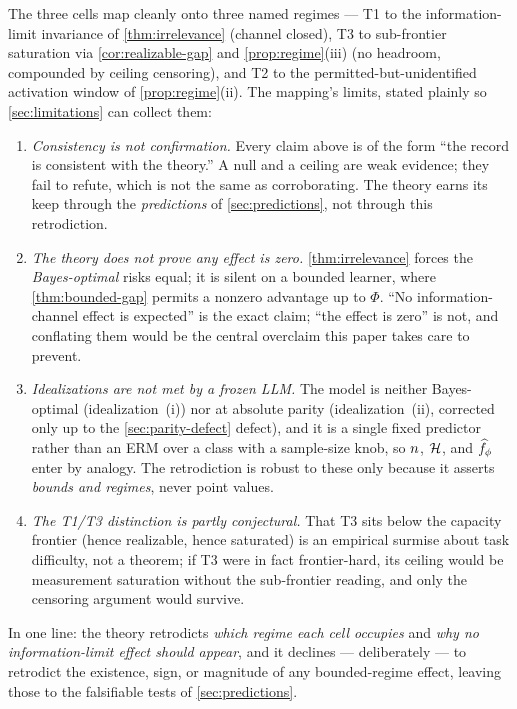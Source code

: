 \begin{remark}
\label{rem:anchor-limits}
The three cells map cleanly onto three named regimes --- T1 to the
information-limit invariance of \cref{thm:irrelevance} (channel closed), T3 to
sub-frontier saturation via \cref{cor:realizable-gap} and
\cref{prop:regime}(iii) (no headroom, compounded by ceiling censoring), and T2
to the permitted-but-unidentified activation window of \cref{prop:regime}(ii).
The mapping's limits, stated plainly so \cref{sec:limitations} can collect them:
\begin{enumerate}
  \item[(L1)] \emph{Consistency is not confirmation.} Every claim above is of
    the form ``the record is consistent with the theory.'' A null and a ceiling
    are weak evidence; they fail to refute, which is not the same as
    corroborating. The theory earns its keep through the \emph{predictions} of
    \cref{sec:predictions}, not through this retrodiction.
  \item[(L2)] \emph{The theory does not prove any effect is zero.}
    \cref{thm:irrelevance} forces the \emph{Bayes-optimal} risks equal; it is
    silent on a bounded learner, where \cref{thm:bounded-gap} permits a nonzero
    advantage up to $\Phi$. ``No information-channel effect is expected'' is the
    exact claim; ``the effect is zero'' is not, and conflating them would be the
    central overclaim this paper takes care to prevent.
  \item[(L3)] \emph{Idealizations are not met by a frozen LLM.} The model is
    neither Bayes-optimal (idealization~(i)) nor at absolute parity
    (idealization~(ii), corrected only up to the \cref{sec:parity-defect}
    defect), and it is a single fixed predictor rather than an ERM over a class
    with a sample-size knob, so $n$, $\mathcal{H}$, and $\widehat f_{\phi}$
    enter by analogy. The retrodiction is robust to these only because it asserts
    \emph{bounds and regimes}, never point values.
  \item[(L4)] \emph{The T1/T3 distinction is partly conjectural.} That T3 sits
    below the capacity frontier (hence realizable, hence saturated) is an
    empirical surmise about task difficulty, not a theorem; if
    T3 were in fact frontier-hard, its ceiling would be measurement saturation
    without the sub-frontier reading, and only the censoring argument would
    survive.
\end{enumerate}
In one line: the theory retrodicts \emph{which regime each cell occupies} and
\emph{why no information-limit effect should appear}, and it declines ---
deliberately --- to retrodict the existence, sign, or magnitude of any
bounded-regime effect, leaving those to the falsifiable tests of
\cref{sec:predictions}.
\end{remark}

